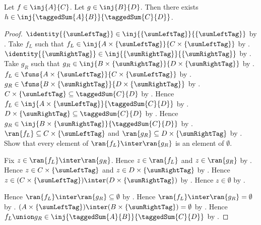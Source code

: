 \begin{theorem}\label{tagged_sum_injection_congruent}
    Let $f\in\inj{A}{C}$.
    Let $g\in\inj{B}{D}$.
    Then there exists $h\in\inj{\taggedSum{A}{B}}{\taggedSum{C}{D}}$.
\end{theorem}
\begin{proof}
    $\identity{\{\sumLeftTag\}}
        \in\inj{\{\sumLeftTag\}}{\{\sumLeftTag\}}$
        by
        .
    Take $f_L$ such that $f_L\in\inj{A\times\{\sumLeftTag\}}
        {C\times\{\sumLeftTag\}}$
        by .
    $\identity{\{\sumRightTag\}}
        \in\inj{\{\sumRightTag\}}{\{\sumRightTag\}}$
        by
        .
    Take $g_R$ such that $g_R\in\inj{B\times\{\sumRightTag\}}
        {D\times\{\sumRightTag\}}$
        by .
    $f_L\in\funs{A\times\{\sumLeftTag\}}
        {C\times\{\sumLeftTag\}}$ by .
    $g_R\in\funs{B\times\{\sumRightTag\}}
        {D\times\{\sumRightTag\}}$ by .
    $C\times\{\sumLeftTag\}\subseteq\taggedSum{C}{D}$
        by .
    Hence $f_L\in\inj{A\times\{\sumLeftTag\}}{\taggedSum{C}{D}}$
        by .
    $D\times\{\sumRightTag\}\subseteq\taggedSum{C}{D}$
        by .
    Hence $g_R\in\inj{B\times\{\sumRightTag\}}{\taggedSum{C}{D}}$
        by .
    $\ran{f_L}\subseteq C\times\{\sumLeftTag\}$ and
        $\ran{g_R}\subseteq D\times\{\sumRightTag\}$
        by .
    Show that every element of $\ran{f_L}\inter\ran{g_R}$
        is an element of $\emptyset$.
    \begin{subproof}
        Fix $z\in\ran{f_L}\inter\ran{g_R}$.
        Hence $z\in\ran{f_L}$ and $z\in\ran{g_R}$ by .
        Hence $z\in C\times\{\sumLeftTag\}$ and
            $z\in D\times\{\sumRightTag\}$ by .
        Hence $z\in
            (C\times\{\sumLeftTag\})\inter
                (D\times\{\sumRightTag\})$ by .
        Hence $z\in\emptyset$
            by .
    \end{subproof}
    Hence $\ran{f_L}\inter\ran{g_R}\subseteq\emptyset$
        by .
    Hence $\ran{f_L}\inter\ran{g_R}=\emptyset$
        by .
    $(A\times\{\sumLeftTag\})\inter
        (B\times\{\sumRightTag\})=\emptyset$
        by .
    Hence $f_L\union g_R
        \in\inj{\taggedSum{A}{B}}{\taggedSum{C}{D}}$
        by .
\end{proof}

